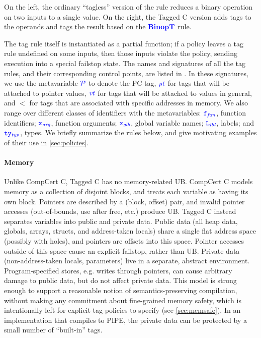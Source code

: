 \documentclass{llncs}
\begin{document}
\begin{minipage}[t]{0.24\textwidth}
  \binopsteptagless
\end{minipage}
\begin{minipage}[t]{0.75\textwidth}
  \binopstepnolabel
\end{minipage}

\noindent
On the left, the ordinary ``tagless'' version of the rule reduces a
binary operation on two inputs to a single value.
On the right, the Tagged C version adds tags to the operands and tags the result
based on the \(\color{blue} \mathbf{BinopT}\) rule.

The tag rule itself is instantiated as a partial function; if a policy leaves a tag rule
undefined on some inputs, then those inputs violate the policy, sending
execution into a special failstop state. The names and signatures of all the tag rules,
and their corresponding control points, are listed in .
In these signatures, we use the metavariable \(\mathcal{\color{blue} P\mathit{}}\) to denote the PC tag,
\(\mathit{\color{blue} pt}\) for tags that will be attached to pointer values, \(\mathit{\color{blue} vt}\) for tags that will be
attached to values in general, and \(\lt\) for tags that are associated with
specific addresses in memory. We also range over different classes of identifiers
with the metavariables: \(\mathtt{\color{blue} f}_{\color{blue} \mathit{fun}}\), function identifiers; \(\mathtt{\color{blue} x}_{\color{blue} \mathit{arg}}\), function arguments;
\(\mathtt{\color{blue} x}_{\color{blue} \mathit{glb}}\), global variable names; \(\mathtt{\color{blue} L}_{\color{blue} \mathit{lbl}}\), labels; and \(\mathtt{\color{blue} ty}_{\color{blue} \mathit{typ}}\), types.
We briefly summarize the rules below, and give motivating examples of their use in
\cref{sec:policies}.

\paragraph{Memory} Unlike CompCert C, Tagged C has no memory-related UB.
CompCert C models memory as a collection of disjoint blocks,
and treats each variable as having its own block. Pointers are described by a (block, offset) pair,
and invalid pointer accesses (out-of-bounds, use after free, etc.) produce UB.
Tagged C instead separates variables
into public and private data. Public data (all heap data, globals, arrays, structs, and
address-taken locals) share a single flat address space (possibly with holes), and pointers are
offsets into this space. Pointer accesses outside of this space cause
an explicit failstop, rather than UB. 
Private data (non-address-taken locals, parameters) live in a separate, abstract environment.
Program-specified stores, e.g. writes through pointers, can cause arbitrary damage to public
data, but do not affect private data. 
This model is strong enough to support a reasonable
notion of semantics-preserving compilation, without making any commitment about fine-grained
memory safety, which is intentionally left for explicit tag policies to specify
(see \cref{sec:memsafe}).
In an implementation that compiles to PIPE, the private data can be protected by a small number of
``built-in'' tags.
\end{document}
